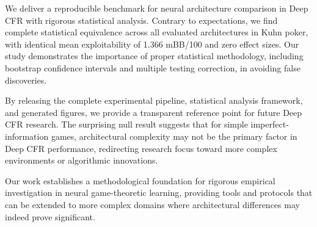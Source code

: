 \documentclass[10pt,twocolumn]{article}
\theoremstyle{definition}
\begin{document}
We deliver a reproducible benchmark for neural architecture comparison in Deep CFR with rigorous statistical analysis. Contrary to expectations, we find complete statistical equivalence across all evaluated architectures in Kuhn poker, with identical mean exploitability of 1.366 mBB/100 and zero effect sizes. Our study demonstrates the importance of proper statistical methodology, including bootstrap confidence intervals and multiple testing correction, in avoiding false discoveries.

By releasing the complete experimental pipeline, statistical analysis framework, and generated figures, we provide a transparent reference point for future Deep CFR research. The surprising null result suggests that for simple imperfect-information games, architectural complexity may not be the primary factor in Deep CFR performance, redirecting research focus toward more complex environments or algorithmic innovations.

Our work establishes a methodological foundation for rigorous empirical investigation in neural game-theoretic learning, providing tools and protocols that can be extended to more complex domains where architectural differences may indeed prove significant.

\clearpage


\end{document}
